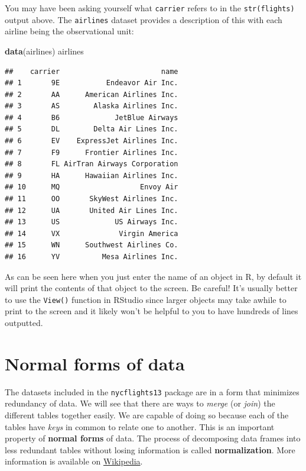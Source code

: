\documentclass[]{tufte-book}
\newenvironment{Shaded}{\begin{snugshade}}{\end{snugshade}}
\newcommand{\KeywordTok}[1]{\textcolor[rgb]{0.13,0.29,0.53}{\textbf{{#1}}}}
\newcommand{\NormalTok}[1]{{#1}}
\begin{document}
You may have been asking yourself what \texttt{carrier} refers to in the
\texttt{str(flights)} output above. The \texttt{airlines} dataset
provides a description of this with each airline being the observational
unit:

\begin{Shaded}
\begin{Highlighting}[]
\KeywordTok{data}\NormalTok{(airlines)}
\NormalTok{airlines}
\end{Highlighting}
\end{Shaded}

\begin{verbatim}
##    carrier                        name
## 1       9E           Endeavor Air Inc.
## 2       AA      American Airlines Inc.
## 3       AS        Alaska Airlines Inc.
## 4       B6             JetBlue Airways
## 5       DL        Delta Air Lines Inc.
## 6       EV    ExpressJet Airlines Inc.
## 7       F9      Frontier Airlines Inc.
## 8       FL AirTran Airways Corporation
## 9       HA      Hawaiian Airlines Inc.
## 10      MQ                   Envoy Air
## 11      OO       SkyWest Airlines Inc.
## 12      UA       United Air Lines Inc.
## 13      US             US Airways Inc.
## 14      VX              Virgin America
## 15      WN      Southwest Airlines Co.
## 16      YV          Mesa Airlines Inc.
\end{verbatim}

As can be seen here when you just enter the name of an object in R, by
default it will print the contents of that object to the screen. Be
careful! It's usually better to use the \texttt{View()} function in
RStudio since larger objects may take awhile to print to the screen and
it likely won't be helpful to you to have hundreds of lines outputted.

\section{Normal forms of data}\label{normal-forms-of-data}

The datasets included in the \texttt{nycflights13} package are in a form
that minimizes redundancy of data. We will see that there are ways to
\emph{merge} (or \emph{join}) the different tables together easily. We
are capable of doing so because each of the tables have \emph{keys} in
common to relate one to another. This is an important property of
\textbf{normal forms} of data. The process of decomposing data frames
into less redundant tables without losing information is called
\textbf{normalization}. More information is available on
\href{https://en.wikipedia.org/wiki/Database_normalization}{Wikipedia}.
\end{document}
